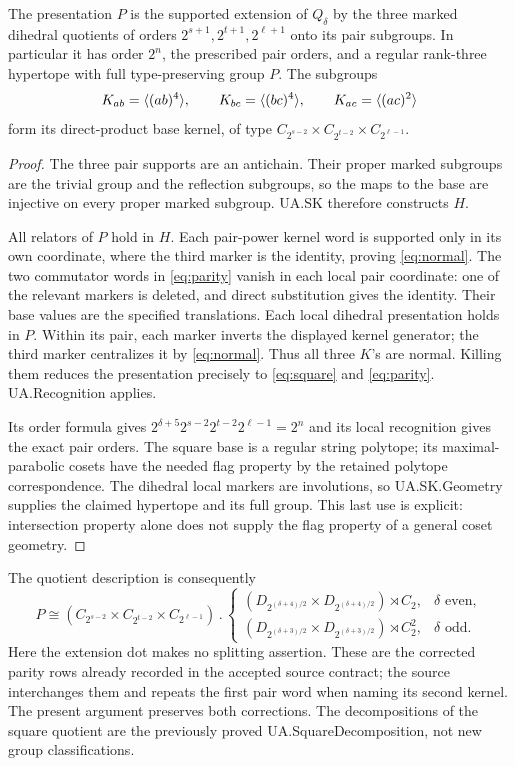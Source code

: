 \begin{theorem}\label{cor:hypertope}
The presentation $P$ is the supported extension of $Q_\delta$ by the three
marked dihedral quotients of orders $2^{s+1},2^{t+1},2^{\ell+1}$ onto
its pair subgroups. In particular it has order $2^n$, the prescribed pair
orders, and a regular rank-three hypertope with full type-preserving group
$P$. The subgroups
\[
 K_{ab}=\langle (ab)^4\rangle,\qquad K_{bc}=\langle (bc)^4\rangle,\qquad
 K_{ac}=\langle (ac)^2\rangle
\]
form its direct-product base kernel, of type
$C_{2^{s-2}}\times C_{2^{t-2}}\times C_{2^{\ell-1}}$.
\end{theorem}
\begin{proof}
The three pair supports are an antichain. Their proper marked subgroups
are the trivial group and the reflection subgroups, so the maps to the
base are injective on every proper marked subgroup. UA.SK therefore
constructs $H$.

All relators of $P$ hold in $H$. Each pair-power kernel word is supported
only in its own coordinate, where the third marker is the identity, proving
\eqref{eq:normal}. The two commutator words in \eqref{eq:parity} vanish in
each local pair coordinate: one of the relevant markers is deleted, and
direct substitution gives the identity. Their base values are the specified
translations. Each local dihedral presentation holds in $P$. Within its
pair, each marker inverts the displayed kernel generator; the third marker
centralizes it by \eqref{eq:normal}. Thus all three $K$'s are normal.
Killing them reduces the presentation precisely to \eqref{eq:square} and
\eqref{eq:parity}. UA.Recognition applies.

Its order formula gives
$2^{\delta+5}2^{s-2}2^{t-2}2^{\ell-1}=2^n$ and its local recognition gives
the exact pair orders. The square base is a regular string polytope; its
maximal-parabolic cosets have the needed flag property by the retained
polytope correspondence. The dihedral local markers are involutions, so
UA.SK.Geometry supplies the claimed hypertope and its full group. This
last use is explicit: intersection property alone does not supply the flag
property of a general coset geometry.
\end{proof}

The quotient description is consequently
\[
 P\cong
 (C_{2^{s-2}}\times C_{2^{t-2}}\times C_{2^{\ell-1}})\mathbin{.}
 \begin{cases}
 (D_{2^{(\delta+4)/2}}\times D_{2^{(\delta+4)/2}})\rtimes C_2,
       &\delta\text{ even},\\
 (D_{2^{(\delta+3)/2}}\times D_{2^{(\delta+3)/2}})\rtimes C_2^2,
       &\delta\text{ odd}.
 \end{cases}
\]
Here the extension dot makes no splitting assertion. These are the corrected
parity rows already recorded in the accepted source contract; the source
interchanges them and repeats the first pair word when naming its second
kernel. The present argument preserves both corrections. The decompositions
of the square quotient are the previously proved UA.SquareDecomposition,
not new group classifications.


